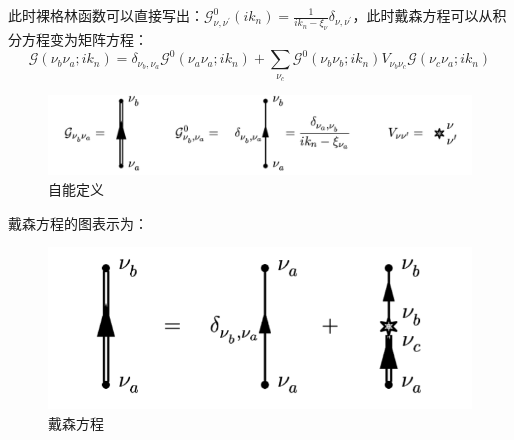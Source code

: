 \documentclass[10pt,openany]{book}
\theoremstyle{thmstyle} %
\theoremstyle{defstyle} %
\theoremstyle{prostyle} %
\begin{document}
此时裸格林函数可以直接写出：$ \mathcal{G}_{\nu, \nu^{\prime}}^0\left(i k_n\right)=\frac{1}{i k_n-\xi_\nu} \delta_{\nu, \nu^{\prime}} $，此时戴森方程可以从积分方程变为矩阵方程：
\begin{equation}
  \mathcal{G}\left(\nu_b \nu_a ; i k_n\right)=\delta_{\nu_b, \nu_a} \mathcal{G}^0\left(\nu_a \nu_a ; i k_n\right)+\sum_{\nu_c} \mathcal{G}^0\left(\nu_b \nu_b ; i k_n\right) V_{\nu_b \nu_c} \mathcal{G}\left(\nu_c \nu_a ; i k_n\right)
\end{equation} 
\begin{figure}[htp]
  \centering
  \includegraphics[scale=0.7]{biaoji.png}
  \caption{自能定义}
\end{figure}
戴森方程的图表示为：
\begin{figure}[htbp]
  \centering
  \includegraphics*[scale=0.7]{DaysonEq.png}
  \caption{戴森方程}
\end{figure}
\end{document}

